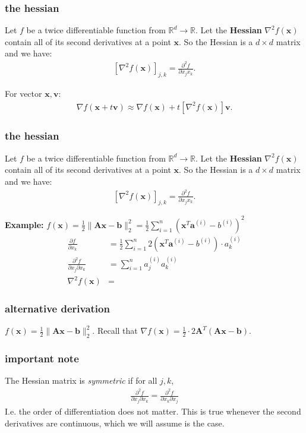 \documentclass[compress]{beamer}
\newcommand{\bv}[1]{\mathbf{#1}}
\newcommand{\R}{\mathbb{R}}
\begin{document}
\begin{frame}[t]
	\frametitle{the hessian}
	Let $f$ be a twice differentiable function from $\R^d \rightarrow \R$. Let the \textbf{\alert{Hessian}} $\nabla^2 f(\bv{x})$ contain all of its second derivatives at a point $\bv{x}$. So the Hessian is a $d\times d$ matrix and we have:
	\begin{align*}
		 \left[\nabla^2 f(\bv{x})\right]_{j,k} = \frac{\partial^2 f}{\partial x_j x_k}. 
	\end{align*}
	
	For vector $\bv{x}, \bv{v}$:
	\begin{align*}
		\nabla f(\bv{x} + t\bv{v}) \approx \nabla f(\bv{x}) + t\left[\nabla^2 f(\bv{x})\right]\bv{v}.
	\end{align*}
\end{frame}

\begin{frame}[t]
	\frametitle{the hessian}
	Let $f$ be a twice differentiable function from $\R^d \rightarrow \R$. Let the \textbf{\alert{Hessian}} $\nabla^2 f(\bv{x})$ contain all of its second derivatives at a point $\bv{x}$. So the Hessian is a $d\times d$ matrix and we have:
	\begin{align*}
		\left[\nabla^2 f(\bv{x})\right]_{j,k} = \frac{\partial^2 f}{\partial x_j x_k}. 
	\end{align*}
	
	\textbf{Example:} $f(\bv{x}) = \frac{1}{2}\|\bv{A}\bv{x} - \bv{b}\|_2^2 = \frac{1}{2}\sum_{i=1}^n \left(\bv{x}^T\bv{a}^{(i)} - {b}^{(i)}\right)^2$
	\begin{align*}
		\frac{\partial f}{\partial x_k} &= \frac{1}{2}\sum_{i=1}^n 2\left(\bv{x}^T\bv{a}^{(i)} - {b}^{(i)}\right)\cdot a^{(i)}_k \\
		\frac{\partial^2 f}{\partial x_j\partial x_k} &= \sum_{i=1}^n a^{(i)}_j  a^{(i)}_k \\
		\nabla^2 f(\bv{x}) &=  
	\end{align*}
\end{frame}



\begin{frame}[t]
	\frametitle{alternative derivation}
	$f(\bv{x}) = \frac{1}{2}\|\bv{A}\bv{x} - \bv{b}\|_2^2$. Recall that $\nabla f(\bv{x}) = \frac{1}{2}\cdot 2\bv{A}^T(\bv{A}\bv{x}-\bv{b}).$
	
\end{frame}

\begin{frame}[t]
	\frametitle{important note}
	The Hessian matrix is \emph{symmetric} if for all $j,k$, 
	\begin{align*}
		\frac{\partial^2 f}{\partial x_j\partial x_k} = \frac{\partial^2 f}{\partial x_k\partial x_j}
	\end{align*}
	I.e. the order of differentiation does not matter. This is true whenever the second derivatives are continuous, which we will assume is the case. 
	\vspace{1em}
\end{frame}
\end{document}
